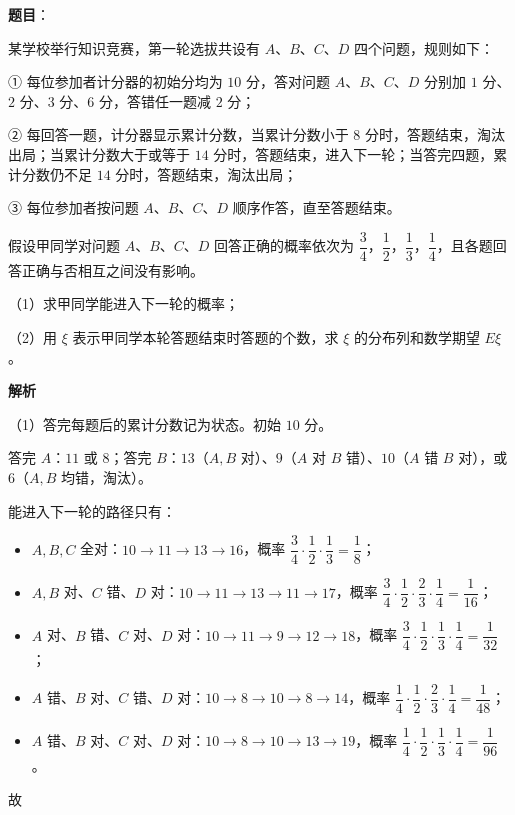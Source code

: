 \begin{answer}

\textbf{题目}：

某学校举行知识竞赛，第一轮选拔共设有 $A$、$B$、$C$、$D$ 四个问题，规则如下：

① 每位参加者计分器的初始分均为 $10$ 分，答对问题 $A$、$B$、$C$、$D$ 分别加 $1$ 分、$2$ 分、$3$ 分、$6$ 分，答错任一题减 $2$ 分；

② 每回答一题，计分器显示累计分数，当累计分数小于 $8$ 分时，答题结束，淘汰出局；当累计分数大于或等于 $14$ 分时，答题结束，进入下一轮；当答完四题，累计分数仍不足 $14$ 分时，答题结束，淘汰出局；

③ 每位参加者按问题 $A$、$B$、$C$、$D$ 顺序作答，直至答题结束。

假设甲同学对问题 $A$、$B$、$C$、$D$ 回答正确的概率依次为 $\dfrac34$，$\dfrac12$，$\dfrac13$，$\dfrac14$，且各题回答正确与否相互之间没有影响。

（1）求甲同学能进入下一轮的概率；

（2）用 $\xi$ 表示甲同学本轮答题结束时答题的个数，求 $\xi$ 的分布列和数学期望 $E\xi$。

\textbf{解析}

（1）答完每题后的累计分数记为状态。初始 $10$ 分。

答完 $A$：$11$ 或 $8$；答完 $B$：$13$（$A,B$ 对）、$9$（$A$ 对 $B$ 错）、$10$（$A$ 错 $B$ 对），或 $6$（$A,B$ 均错，淘汰）。

能进入下一轮的路径只有：

\begin{itemize}
\item $A,B,C$ 全对：$10\to11\to13\to16$，概率 $\dfrac34\cdot\dfrac12\cdot\dfrac13=\dfrac18$；
\item $A,B$ 对、$C$ 错、$D$ 对：$10\to11\to13\to11\to17$，概率 $\dfrac34\cdot\dfrac12\cdot\dfrac23\cdot\dfrac14=\dfrac1{16}$；
\item $A$ 对、$B$ 错、$C$ 对、$D$ 对：$10\to11\to9\to12\to18$，概率 $\dfrac34\cdot\dfrac12\cdot\dfrac13\cdot\dfrac14=\dfrac1{32}$；
\item $A$ 错、$B$ 对、$C$ 错、$D$ 对：$10\to8\to10\to8\to14$，概率 $\dfrac14\cdot\dfrac12\cdot\dfrac23\cdot\dfrac14=\dfrac1{48}$；
\item $A$ 错、$B$ 对、$C$ 对、$D$ 对：$10\to8\to10\to13\to19$，概率 $\dfrac14\cdot\dfrac12\cdot\dfrac13\cdot\dfrac14=\dfrac1{96}$。
\end{itemize}

故


\end{answer}
